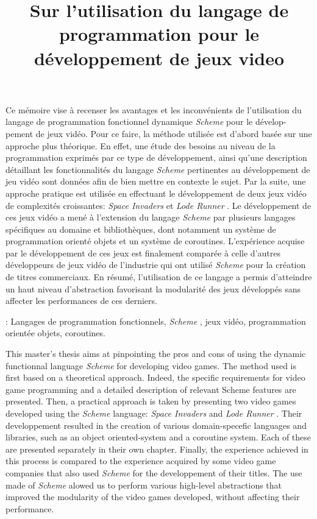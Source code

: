 \documentclass[12pt,twoside,letterpaper,francais]{book}
\title{Sur l'utilisation du langage de programmation \Schemelang pour
  le développement de jeux video}
\newcommand{\lr}{{\textit{Lode Runner }}}
\newcommand{\si}{{\textit{Space Invaders }}}
\newcommand{\Schemelang}{{\textit{Scheme }}}
\begin{document}
\setcounter{page}{1}
\PagesCouverture

\setlength\textheight{9.0in}
\setlength\headsep{20pt}
\setlength\headheight{0in}
\setlength\topmargin{0in}
\addtolength{\voffset}{-0.5in}
\doublespacing

\resume

Ce mémoire vise à recenser les avantages et les inconvénients de
l'utilisation du langage de programmation fonctionnel dynamique
\Schemelang pour le dévelop-pement de jeux vidéo. Pour ce faire, la
méthode utilisée est d'abord basée sur une approche plus théorique. En
effet, une étude des besoins au niveau de la programmation exprimés
par ce type de développement, ainsi qu'une description détaillant les
fonctionnalités du langage \Schemelang pertinentes au développement de
jeu vidéo sont données afin de bien mettre en contexte le sujet. Par
la suite, une approche pratique est utilisée en effectuant le
développement de deux jeux vidéo de complexités croissantes: \si et
\lr. Le développement de ces jeux vidéo a mené à l'extension du
langage \Schemelang par plusieurs langages spécifiques au domaine et
bibliothèques, dont notamment un système de programmation orienté
objets et un système de coroutines. L'expérience acquise par le
développement de ces jeux est finalement comparée à celle d'autres
développeurs de jeux vidéo de l'industrie qui ont utilisé \Schemelang
pour la création de titres commerciaux. En résumé, l'utilisation de ce
langage a permis d'atteindre un haut niveau d'abstraction favorisant
la modularité des jeux développés sans affecter les performances de
ces derniers.

\vspace{2em}

: Langages de programmation fonctionnels,
\Schemelang, jeux vidéo, programmation orientée objets, coroutines.

\abstract


This master's thesis aims at pinpointing the pros and cons of using
the dynamic functionnal language \Schemelang for developing video
games. The method used is first based on a theoretical
approach. Indeed, the specific requirements for video game programming
and a detailed description of relevant Scheme features are presented.
Then, a practical approach is taken by presenting two video games
developed using the \Schemelang language: \si and \lr. Their
developpement resulted in the creation of various domain-specefic
languages and libraries, such as an object oriented-system and a
coroutine system. Each of these are presented separately in their own
chapter. Finally, the experience achieved in this process is compared
to the experience acquired by some video game companies that also used
\Schemelang for the developpement of their titles. The use made of
\Schemelang alowed us to perform various high-level abstractions that
improved the modularity of the video games developed, without
affecting their performance.
\end{document}
